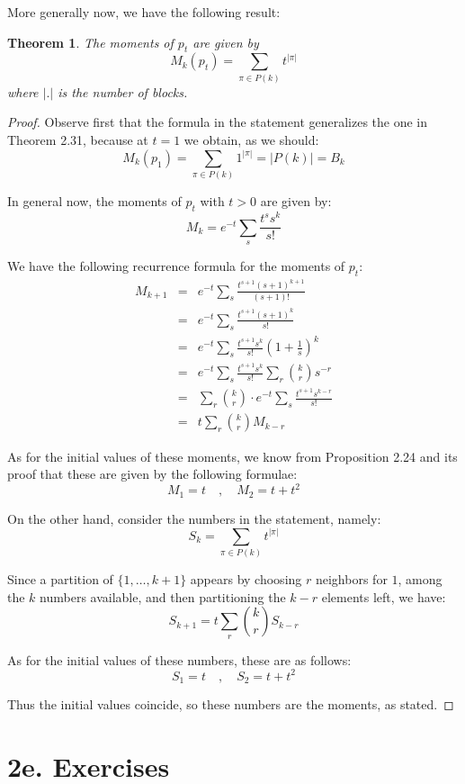\documentclass[12pt]{amsbook}
\newtheorem{theorem}{Theorem}[chapter]
\begin{document}
More generally now, we have the following result:

\begin{theorem}
The moments of $p_t$ are given by
$$M_k(p_t)=\sum_{\pi\in P(k)}t^{|\pi|}$$
where $|.|$ is the number of blocks.
\end{theorem}

\begin{proof}
Observe first that the formula in the statement generalizes the one in Theorem 2.31, because at $t=1$ we obtain, as we should:
$$M_k(p_1)
=\sum_{\pi\in P(k)}1^{|\pi|}
=|P(k)|
=B_k$$

In general now, the moments of $p_t$ with $t>0$ are given by:
$$M_k=e^{-t}\sum_s\frac{t^ss^k}{s!}$$

We have the following recurrence formula for the moments of $p_t$:
\begin{eqnarray*}
M_{k+1}
&=&e^{-t}\sum_s\frac{t^{s+1}(s+1)^{k+1}}{(s+1)!}\\
&=&e^{-t}\sum_s\frac{t^{s+1}(s+1)^k}{s!}\\
&=&e^{-t}\sum_s\frac{t^{s+1}s^k}{s!}\left(1+\frac{1}{s}\right)^k\\
&=&e^{-t}\sum_s\frac{t^{s+1}s^k}{s!}\sum_r\binom{k}{r}s^{-r}\\
&=&\sum_r\binom{k}{r}\cdot e^{-t}\sum_s\frac{t^{s+1}s^{k-r}}{s!}\\
&=&t\sum_r\binom{k}{r}M_{k-r}
\end{eqnarray*}

As for the initial values of these moments, we know from Proposition 2.24 and its proof that these are given by the following formulae:
$$M_1=t\quad,\quad 
M_2=t+t^2$$

On the other hand, consider the numbers in the statement, namely:
$$S_k=\sum_{\pi\in P(k)}t^{|\pi|}$$

Since a partition of $\{1,\ldots,k+1\}$ appears by choosing $r$ neighbors for $1$, among the $k$ numbers available, and then partitioning the $k-r$ elements left, we have:
$$S_{k+1}=t\sum_r\binom{k}{r}S_{k-r}$$

As for the initial values of these numbers, these are as follows:
$$S_1=t\quad,\quad 
S_2=t+t^2$$

Thus the initial values coincide, so these numbers are the moments, as stated.
\end{proof}

\section*{2e. Exercises}
\end{document}
